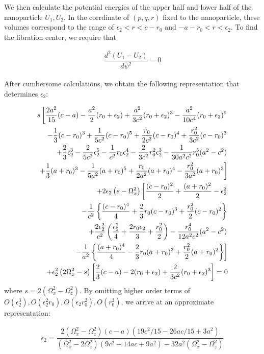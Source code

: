 \documentclass[aps, prl, 
amsmath, showpacs, preprintnumbers, twocolumn, amssymb, amsmath, superscriptaddress]{revtex4-1}
\begin{document}
We then calculate the potential energies of the upper half and lower half of the nanoparticle $U_1,U_2$. In the corrdinate of $(p,q,r)$ fixed to the nanoparticle, these volumes correspond to the range of $\epsilon_2<r<c-r_0$ and  $-a-r_0<r<\epsilon_2$. To find the libration center, we require that 

\begin{align}
\dfrac{d^2(U_1-U_2)}{d\psi^2}=0
\end{align}

After cumbersome calculations, we obtain the following representation that determines $\epsilon_2$:

\begin{align}
s \left[ \dfrac{2a^2}{15}(c-a)-\dfrac{a^2}{2}(r_0+\epsilon_2)+\dfrac{a^2}{3c^2}(r_0+\epsilon_2)^3-\dfrac{a^2}{10c^4}(r_0+\epsilon_2)^5 \right. \notag \\ 
\left. -\dfrac{1}{3}(c-r_0)^3 +\dfrac{1}{5c^2}(c-r_0)^5+\dfrac{r_0}{2c^2}(c-r_0)^4+\dfrac{r_0^2}{3c^2}(c-r_0)^3 \right. \notag \\ 
\left. +\dfrac{2}{3}\epsilon_2^3-\dfrac{2}{5c^2}\epsilon_2^5-\dfrac{1}{c^2}r_0\epsilon_2^4- \dfrac{2}{3c^2}r_0^2\epsilon_2^3 -\dfrac{1}{30a^2c^2}r_0^5(a^2-c^2) \right. \notag \\ 
\left. +\dfrac{1}{3}(a+r_0)^3-\dfrac{1}{5a^2}(a+r_0)^5 +\dfrac{r_0}{2a^2}(a+r_0)^4-\dfrac{r_0^2}{3a^2}(a+r_0)^3 \right] \notag \\
+2\epsilon_2 \left(s- \Omega_x^2 \right) \left[ \dfrac{(c-r_0)^2}{2}+\dfrac{(a+r_0)^2}{2}-\epsilon_2^2 \right. \notag \\ 
\left. -\dfrac{1}{c^2} \left \{ \dfrac{(c-r_0)^4}{4} +\dfrac{2}{3}r_0(c-r_0)^3 +\dfrac{r_0^2}{2}(c-r_0)^2 \right \} \right. \notag \\
\left. +\dfrac{2\epsilon_2^2}{c^2} \left( \dfrac{\epsilon_2^2}{4} +\dfrac{2r_0\epsilon_2}{3}+\dfrac{r_0^2}{2} \right) -\dfrac{r_0^4}{12a^2c^2}(a^2-c^2) \right. \notag \\ 
\left. -\dfrac{1}{a^2} \left \{ \dfrac{(a+r_0)^4}{4} -\dfrac{2}{3}r_0(a+r_0)^3 +\dfrac{r_0^2}{2}(a+r_0)^2 \right \}\right] \notag \\
+\epsilon_2^2 \left( 2 \Omega_x^2-s \right) \left[ \dfrac{2}{3}(c-a)-2(r_0+\epsilon_2)+\dfrac{2}{3c^2}(r_0+\epsilon_2)^3 \right] =0
\end{align}
where $s=2(\Omega_x^2-\Omega_z^2)$. By omitting higher order terms of $O(\epsilon_2^3), O(\epsilon_2^2 r_0), O(\epsilon_2 r_0^2), O(r_0^3)$, we arrive at an approximate representation:

\begin{align}
\epsilon_2 = \dfrac{2(\Omega_x^2-\Omega_z^2)(c-a)(19c^2/15-26ac/15+3a^2)}{(\Omega_x^2-2\Omega_z^2)(9c^2+14ac+9a^2)-32a^2(\Omega_x^2-\Omega_z^2)}
\end{align}
\end{document}
